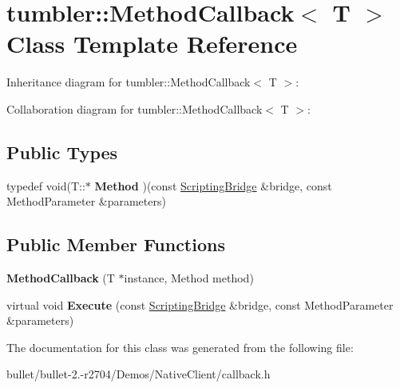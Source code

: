 \hypertarget{classtumbler_1_1_method_callback}{\section{tumbler\+:\+:Method\+Callback$<$ T $>$ Class Template Reference}
\label{classtumbler_1_1_method_callback}
}


Inheritance diagram for tumbler\+:\+:Method\+Callback$<$ T $>$\+:


Collaboration diagram for tumbler\+:\+:Method\+Callback$<$ T $>$\+:
\subsection*{Public Types}
\begin{DoxyCompactItemize}
\item 
\hypertarget{classtumbler_1_1_method_callback_ac7c7412ef0c25eee913ed8b43af433ae}{typedef void(T\+::$\ast$ {\bfseries Method} )(const \hyperlink{classtumbler_1_1_scripting_bridge}{Scripting\+Bridge} \&bridge, const Method\+Parameter \&parameters)}\label{classtumbler_1_1_method_callback_ac7c7412ef0c25eee913ed8b43af433ae}

\end{DoxyCompactItemize}
\subsection*{Public Member Functions}
\begin{DoxyCompactItemize}
\item 
\hypertarget{classtumbler_1_1_method_callback_acda5bc495e4a86fc7d61ca2f4fadfbf1}{{\bfseries Method\+Callback} (T $\ast$instance, Method method)}\label{classtumbler_1_1_method_callback_acda5bc495e4a86fc7d61ca2f4fadfbf1}

\item 
\hypertarget{classtumbler_1_1_method_callback_ab6602ad113ba3578690f3aa97644b0af}{virtual void {\bfseries Execute} (const \hyperlink{classtumbler_1_1_scripting_bridge}{Scripting\+Bridge} \&bridge, const Method\+Parameter \&parameters)}\label{classtumbler_1_1_method_callback_ab6602ad113ba3578690f3aa97644b0af}

\end{DoxyCompactItemize}


The documentation for this class was generated from the following file\+:\begin{DoxyCompactItemize}
\item 
bullet/bullet-\/2.-\/r2704/\+Demos/\+Native\+Client/callback.\+h\end{DoxyCompactItemize}
